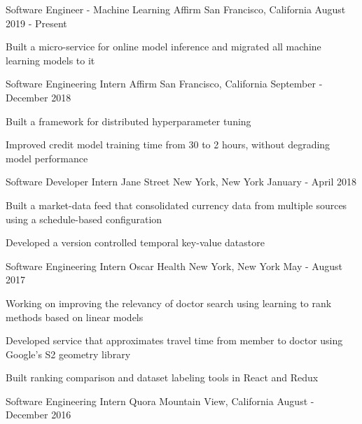 \begin{cventries}
  \cventry
    {Software Engineer - Machine Learning}
    {Affirm}
    {San Francisco, California}
    {August 2019 - Present}
    {
      \begin{cvitems}
      \item Built a micro-service for online model inference and migrated all machine learning models to it
      \end{cvitems}
    }
  \cventry
    {Software Engineering Intern}
    {Affirm}
    {San Francisco, California}
    {September - December 2018}
    {
      \begin{cvitems}
      \item Built a framework for distributed hyperparameter tuning
      \item Improved credit model training time from 30 to 2 hours, without degrading model performance
      \end{cvitems}
    }
  \cventry
    {Software Developer Intern}
    {Jane Street}
    {New York, New York}
    {January - April 2018}
    {
      \begin{cvitems}
      \item Built a market-data feed that consolidated currency data from multiple sources using a schedule-based configuration
      \item Developed a version controlled temporal key-value datastore
      \end{cvitems}
    }
  \cventry
    {Software Engineering Intern}
    {Oscar Health}
    {New York, New York}
    {May - August 2017}
    {
      \begin{cvitems}
      \item Working on improving the relevancy of doctor search using learning to rank methods based on linear models
      \item Developed service that approximates travel time from member to doctor using Google's S2 geometry library
      \item Built ranking comparison and dataset labeling tools in React and Redux%
      \end{cvitems}
    }
  \cventry
    {Software Engineering Intern}
    {Quora}
    {Mountain View, California}
    {August - December 2016}
    {
      \begin{cvitems}

\end{cvitems}}
\end{cventries}
